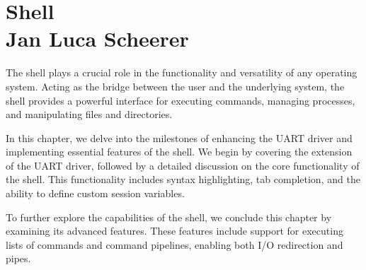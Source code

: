 

\def\shellquote{\textcolor{shell_escape}{\texttt{\string\"}}}
\def\shellrawquote{\textcolor{shell_default}{\texttt{"}}}



\chapter[Shell]{Shell \\ \Large \textnormal{Jan Luca Scheerer}}
\label{chapter:shell}

The shell plays a crucial role in the functionality and versatility of any operating system. Acting as the bridge between the user and the underlying system, the shell provides a powerful interface for executing commands, managing processes, and manipulating files and directories. 

In this chapter, we delve into the milestones of enhancing the UART driver and implementing essential features of the shell. We begin by covering the extension of the UART driver, followed by a detailed discussion on the core functionality of the shell. This functionality includes syntax highlighting, tab completion, and the ability to define custom session variables.

To further explore the capabilities of the shell, we conclude this chapter by examining its advanced features. These features include support for executing lists of commands and command pipelines, enabling both I/O redirection and pipes.

